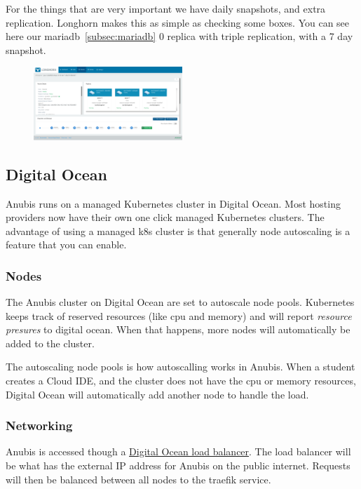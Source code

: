 For the things that are very important we have daily snapshots, and extra replication.
Longhorn makes this as simple as checking some boxes.
You can see here our mariadb~\ref{subsec:mariadb} 0 replica with triple replication, 
with a 7 day snapshot.

\begin{figure}
    \centering
    \includegraphics[width=0.5\textwidth]{figures/longhorn-mariadb}
\end{figure}

\subsection{Digital Ocean}\label{subsec:digital-ocean}

Anubis runs on a managed Kubernetes cluster in Digital Ocean.
Most hosting providers now have their own one click managed Kubernetes clusters.
The advantage of using a managed k8s cluster is that generally node autoscaling is
a feature that you can enable.

\subsubsection{Nodes}\label{subsubsec:digital-ocean-nodes}

The Anubis cluster on Digital Ocean are set to autoscale node pools.
Kubernetes keeps track of reserved resources (like cpu and memory) and will
report \textit{resource presures} to digital ocean.
When that happens, more nodes will automatically be added to the cluster.

The autoscaling node pools is how autoscalling works in Anubis.
When a student creates a Cloud IDE, and the cluster does not have the cpu or 
memory resources, Digital Ocean will automatically add another node to handle the load.

\subsubsection{Networking}\label{subsubsec:digital-ocean-networking}

Anubis is accessed though a \href{https://docs.digitalocean.com/products/networking/load-balancers/}{Digital Ocean load balancer}.
The load balancer will be what has the external IP address for Anubis on the public internet.
Requests will then be balanced between all nodes to the traefik service.

